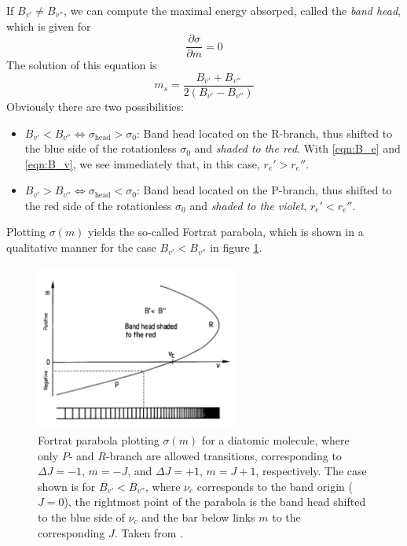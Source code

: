 If $B_{v'} \neq B_{v''}$, we can compute the maximal energy absorped, 
called the \emph{band head}, which is given for 
\begin{equation}
    \frac{\partial \sigma}{\partial m} = 0 
\end{equation}
The solution of this equation is
\begin{equation}
    m_s = \frac{B_{v'} + B_{v''}}{2(B_{v'} - B_{v''})}
\end{equation}
Obviously there are two possibilities:
\begin{itemize}
        \item $B_{v'} < B_{v''} \Leftrightarrow \sigma_\mathrm{head} > \sigma_0$:
            Band head located on the R-branch, thus shifted 
            to the blue side of the rotationless $\sigma_0$ 
            and \emph{shaded to the red}. With \eqref{eqn:B_e} and \eqref{eqn:B_v}, 
            we see immediately that, in this case, $r_e' > r_e''$.
        \item $B_{v'} > B_{v''} \Leftrightarrow \sigma_\mathrm{head} < \sigma_0$:
            Band head located on the P-branch, thus shifted 
            to the red side of the rotationless $\sigma_0$ 
            and \emph{shaded to the violet}, 
            $r_e' < r_e''$.
\end{itemize}
Plotting $\sigma(m)$ yields the so-called Fortrat parabola, which is shown in a 
qualitative manner for the case $B_{v'} < B_{v''}$ in figure \ref{fig:fortrat}.
\begin{figure}
    \centering
    \includegraphics[width=0.6\textwidth]{pics/fortrat.pdf}
    \caption{Fortrat parabola plotting $\sigma(m)$ for a diatomic molecule, where 
    only $P$- and $R$-branch are allowed transitions, corresponding to 
    $\Delta J = -1$, $m = -J$, and $\Delta J = +1$, $m = J + 1$, respectively. 
    The case shown is for $B_{v'} < B_{v''}$, where $\nu_c$ corresponds to the 
    band origin ($J = 0$), the rightmost point of the parabola is the 
    band head shifted to the blue side of $\nu_c$ and the bar below links $m$ to 
    the corresponding $J$. Taken from \cite{Demtroeder1}.
    }
    \label{fig:fortrat}
\end{figure}


